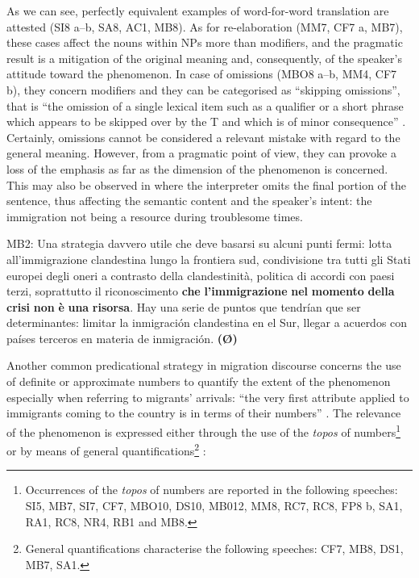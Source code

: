 \documentclass[output=paper]{langscibook}
\begin{document}
As we can see, perfectly equivalent examples of word-for-word translation are attested (SI8 a--b, SA8, AC1, MB8). As for re-elaboration (MM7, CF7 a, MB7), these cases affect the nouns within NPs more than modifiers, and the pragmatic result is a mitigation of the original meaning and, consequently, of the speaker’s attitude toward the phenomenon. In case of omissions (MBO8 a--b, MM4, CF7 b), they concern modifiers and they can be categorised as “skipping omissions”, that is “the omission of a single lexical item such as a qualifier or a short phrase which appears to be skipped over by the T and which is of minor consequence” \citep[275]{Barik1975}. Certainly, omissions cannot be considered a relevant mistake with regard to the general meaning. However, from a pragmatic point of view, they can provoke a loss of the emphasis as far as the dimension of the phenomenon is concerned. This may also be observed in  where the interpreter omits the final portion of the sentence, thus affecting the semantic content and the speaker’s intent: the immigration not being a resource during troublesome times.

\ea\label{ex:mori:10}
\ea
MB2: Una strategia davvero utile che deve basarsi su alcuni punti fermi: lotta all'immigrazione clandestina lungo la frontiera sud, condivisione tra tutti gli Stati europei degli oneri a contrasto della clandestinità, politica di accordi con paesi terzi, soprattutto il riconoscimento \textbf{che} \textbf{l'immigrazione} \textbf{nel} \textbf{momento} \textbf{della} \textbf{crisi} \textbf{non} \textbf{è} \textbf{una} \textbf{risorsa}.
\ex
Hay una serie de puntos que tendrían que ser determinantes: limitar la inmigración clandestina en el Sur, llegar a acuerdos con países terceros en materia de inmigración. \textbf{(Ø)}
\z
\z

Another common predicational strategy in migration discourse concerns the use of definite or approximate numbers to quantify the extent of the phenomenon especially when referring to migrants’ arrivals: “the very first attribute applied to immigrants coming to the country is in terms of their numbers” \citep[79]{VanDijk2002}. The relevance of the phenomenon is expressed either through the use of the \textit{topos} of numbers\footnote{Occurrences of the \textit{topos} of numbers are reported in the following speeches: SI5, MB7, SI7, CF7, MBO10, DS10, MB012, MM8, RC7, RC8, FP8 b, SA1, RA1, RC8, NR4, RB1 and MB8.}  or by means of general quantifications\footnote{General quantifications characterise the following speeches: CF7, MB8, DS1, MB7, SA1.} :
\end{document}
